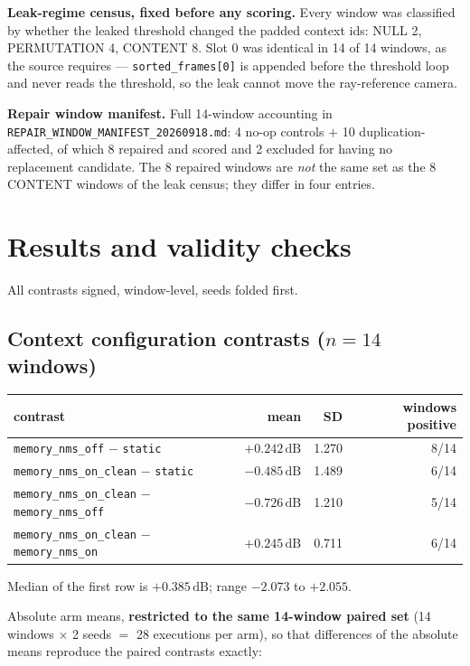 \documentclass[11pt,a4paper]{article}
\newcommand{\code}[1]{\texttt{\small #1}}
\newcommand{\dB}{\,\mathrm{dB}}
\begin{document}
\textbf{Leak-regime census, fixed before any scoring.} Every window was classified by whether the
leaked threshold changed the padded context ids: NULL 2, PERMUTATION 4, CONTENT 8. Slot 0 was
identical in 14 of 14 windows, as the source requires --- \code{sorted\_frames[0]} is appended before
the threshold loop and never reads the threshold, so the leak cannot move the ray-reference camera.

\textbf{Repair window manifest.} Full 14-window accounting in
\code{REPAIR\_WINDOW\_MANIFEST\_20260918.md}: 4 no-op controls $+$ 10 duplication-affected, of which
8 repaired and scored and 2 excluded for having no replacement candidate. The 8 repaired windows are
\emph{not} the same set as the 8 CONTENT windows of the leak census; they differ in four entries.

\section{Results and validity checks}
\label{sec:results}

All contrasts signed, window-level, seeds folded first.

\subsection{Context configuration contrasts ($n=14$ windows)}

\begin{center}\small
\begin{tabular}{@{}lrrr@{}}
\toprule
contrast & mean & SD & windows positive \\
\midrule
\code{memory\_nms\_off} $-$ \code{static}                 & $\mathbf{+0.242\dB}$ & 1.270 & 8/14 \\
\code{memory\_nms\_on\_clean} $-$ \code{static}           & $\mathbf{-0.485\dB}$ & 1.489 & 6/14 \\
\code{memory\_nms\_on\_clean} $-$ \code{memory\_nms\_off} & $\mathbf{-0.726\dB}$ & 1.210 & 5/14 \\
\code{memory\_nms\_on\_clean} $-$ \code{memory\_nms\_on}  & $+0.245\dB$ & 0.711 & 6/14 \\
\bottomrule
\end{tabular}
\end{center}

Median of the first row is $+0.385\dB$; range $-2.073$ to $+2.055$.

Absolute arm means, \textbf{restricted to the same 14-window paired set} (14 windows $\times$ 2 seeds
$=$ 28 executions per arm), so that differences of the absolute means reproduce the paired contrasts
exactly:
\end{document}
